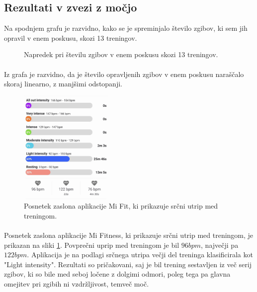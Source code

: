 \documentclass{article}
\begin{document}
\subsection{Rezultati v zvezi z močjo}

Na spodnjem grafu je razvidno, kako se je spreminjalo število zgibov, ki sem jih opravil v enem poskusu, skozi 13 treningov.

\begin{figure}[H]
\centering
\caption{Napredek pri številu zgibov v enem poskusu skozi 13 treningov.}
\end{figure}

\paragraph{}
Iz grafa je razvidno, da je število opravljenih zgibov v enem poskusu naraščalo skoraj linearno, z manjšimi odstopanji.

\begin{figure}[H]
    \centering
    \includegraphics[width=0.4\textwidth]{figures/srcni-utrip.jpg}
    \caption{Posnetek zaslona aplikacije Mi Fit, ki prikazuje srčni utrip med treningom.} 
    \label{fig:srcni-utrip}
\end{figure}

\paragraph{}
Posnetek zaslona aplikacije Mi Fitness, ki prikazuje srčni utrip med treningom, je prikazan na sliki \ref{fig:srcni-utrip}. Povprečni uprip med treningom je bil $96bpm$, največji pa $122bpm$. Aplikacija je na podlagi srčnega utripa večji del treninga klasificirala kot "Light intensity". Rezultati so pričakovani, saj je bil trening sestavljen iz več serij zgibov, ki so bile med seboj ločene z dolgimi odmori, poleg tega pa glavna omejitev pri zgibih ni vzdržljivost, temveč moč. 
\end{document}
